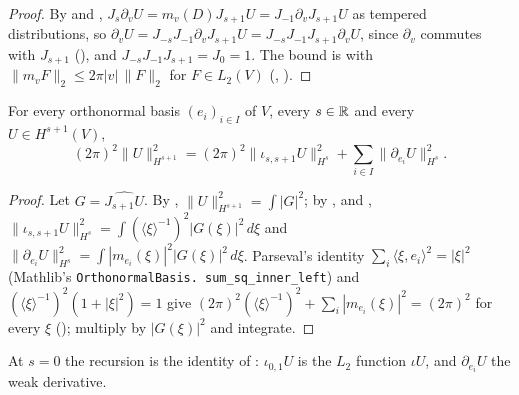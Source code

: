 \begin{proof}
\leanok
By  and ,
$J_s \partial_v U = m_v(D) J_{s+1} U = J_{-1} \partial_v J_{s+1} U$ as tempered distributions,
so $\partial_v U = J_{-s} J_{-1} \partial_v J_{s+1} U = J_{-s} J_{-1} J_{s+1} \partial_v U$, since
$\partial_v$ commutes with $J_{s+1}$ (), and
$J_{-s} J_{-1} J_{s+1} = J_0 = 1$. The bound is  with
$\|m_v F\|_2 \leq 2 \pi |v| \, \|F\|_2$ for $F \in L_2(V)$ (,
).
\end{proof}

\begin{theorem}
\label{thm:sobolev-norm-recursion}
\leanok
{}
For every orthonormal basis $(e_i)_{i \in I}$ of $V$, every $s \in \mathbb{R}$ and every
$U \in H^{s+1}(V)$,
\[
  (2\pi)^2 \|U\|_{H^{s+1}}^2 = (2\pi)^2 \|\iota_{s,s+1} U\|_{H^s}^2
  + \sum_{i \in I} \|\partial_{e_i} U\|_{H^s}^2 .
\]
\end{theorem}

\begin{proof}
\leanok
Let $G = \widehat{J_{s+1} U}$. By , $\|U\|_{H^{s+1}}^2 = \int |G|^2$; by
,  and
,
$\|\iota_{s,s+1} U\|_{H^s}^2 = \int (\langle \xi \rangle^{-1})^2 |G(\xi)|^2 \, d\xi$ and
$\|\partial_{e_i} U\|_{H^s}^2 = \int |m_{e_i}(\xi)|^2 |G(\xi)|^2 \, d\xi$. Parseval's identity
$\sum_i \langle \xi, e_i \rangle^2 = |\xi|^2$ (Mathlib's \texttt{OrthonormalBasis.\allowbreak
sum\_\allowbreak sq\_\allowbreak inner\_\allowbreak left}) and
$(\langle \xi \rangle^{-1})^2 (1 + |\xi|^2) = 1$ give
$(2\pi)^2 (\langle \xi \rangle^{-1})^2 + \sum_i |m_{e_i}(\xi)|^2 = (2\pi)^2$ for every $\xi$
(); multiply by $|G(\xi)|^2$ and integrate.
\end{proof}

At $s = 0$ the recursion is the identity of : $\iota_{0,1} U$ is the
$L_2$ function $\iota U$, and $\partial_{e_i} U$ the weak derivative.

